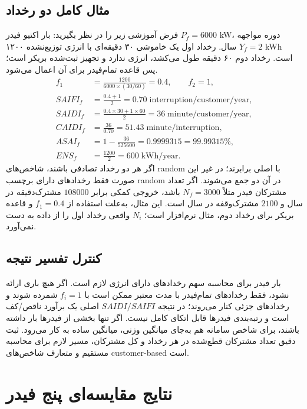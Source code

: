 \documentclass[11pt,a4paper,oneside]{book}
\begin{document}
\subsection{مثال کامل دو رخداد}
فرض آموزشی زیر را در نظر بگیرید: بار اکتیو فیدر $P_f=6000$ kW، دوره مواجهه $Y_f=2$ سال. رخداد اول یک خاموشی ۳۰ دقیقه‌ای با انرژی توزیع‌نشده ۱۲۰۰ kWh است. رخداد دوم ۶۰ دقیقه طول می‌کشد، انرژی ندارد و تجهیز ثبت‌شده بریکر است؛ پس قاعده تمام‌فیدر برای آن اعمال می‌شود.
\begin{align}
 f_1&=\frac{1200}{6000\times(30/60)}=0.4,\qquad f_2=1,\\
 SAIFI_f&=\frac{0.4+1}{2}=0.70\;\mathrm{interruption/customer/year},\\
 SAIDI_f&=\frac{0.4\times30+1\times60}{2}=36\;\mathrm{minute/customer/year},\\
 CAIDI_f&=\frac{36}{0.70}=51.43\;\mathrm{minute/interruption},\\
 ASAI_f&=1-\frac{36}{525600}=0.9999315=99.99315\%,\\
 ENS_f&=\frac{1200}{2}=600\;\mathrm{kWh/year}.
 \label{eq:service-example}
\end{align}
اگر هر دو رخداد تصادفی باشند، شاخص‌های random با اصلی برابرند؛ در غیر این صورت فقط رخدادهای دارای برچسب random در آن دو جمع می‌شوند. اگر تعداد مشترکان فیدر مثلاً $N_f=3000$ باشد، خروجی کمکی برابر $108000$ مشترک‌دقیقه در سال و $2100$ مشترک‌وقفه در سال است. این مثال، به‌علت استفاده از $f_1=0.4$ و قاعده بریکر برای رخداد دوم، مثال نرم‌افزار است؛ $N_i$ واقعی رخداد اول را از داده به دست نمی‌آورد.

\subsection{کنترل تفسیر نتیجه}
بار فیدر برای محاسبه سهم رخدادهای دارای انرژی لازم است. اگر هیچ باری ارائه نشود، فقط رخدادهای تمام‌فیدر با مدت معتبر ممکن است با $f_i=1$ شمرده شوند و رخدادهای جزئی کنار می‌روند؛ در نتیجه $SAIDI/SAIFI$ اصلی یک برآورد ناقص/کف است و رتبه‌بندی فیدرها قابل اتکای کامل نیست. اگر تنها بخشی از فیدرها بار داشته باشند، برای شاخص سامانه هم به‌جای میانگین وزنی، میانگین ساده به کار می‌رود. ثبت دقیق تعداد مشترکان قطع‌شده در هر رخداد و کل مشترکان، مسیر لازم برای محاسبه مستقیم و متعارف شاخص‌های customer-based است.

\section{نتایج مقایسه‌ای پنج فیدر}
\end{document}
